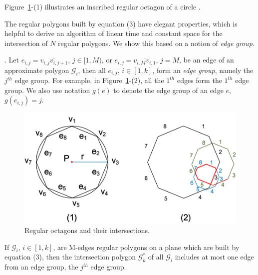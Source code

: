 
Figure~\ref{fig:polygons}-(1) illustrates an inscribed regular octagon of a circle .

The regular polygons built by equation (3) have elegant properties, which is helpful to derive an algorithm of linear time and constant space
for the intersection of $N$ regular polygons. We show this based on a notion of \emph{edge group}.


.
Let $e_{i,j} = \overline{v_{i,j}v_{i,j+1}}$, $j\in [1,M)$, or $e_{i,j} = \overline{v_{i,M}v_{i,1}}$, $j = M$, be an edge of an approximate polygon
$\mathcal{G}_i$, then all $e_{i,j}$, $i\in [1, k]$, form an \emph{edge group}, namely the $j^{th}$ edge group.
%
For example, in Figure~\ref{fig:polygons}-(2), all the $1^{th}$ edges form the $1^{th}$ edge group.
%
We also use notation $g(e)$ to denote the edge group of an edge $e$, \ie $g(e_{i,j})=j$.



\begin{figure}[tb!]
\centering
\includegraphics[scale=0.88]{figures/Fig-polygons.png}
\vspace{-1ex}
\caption{\small Regular octagons and their intersections.}
\vspace{-2ex}
\label{fig:polygons}
\end{figure}



\begin{theorem}
\label{prop-rp-intersection}
If $\mathcal{G}_i$, $i \in [1, k]$, are M-edges regular polygons on a plane which are built by equation (3), then the intersection polygon
$\mathcal{G}^*_k$ of all $\mathcal{G}_i$ includes at most one edge from an edge group, \eg the $j^{th}$ edge group.
\end{theorem}


